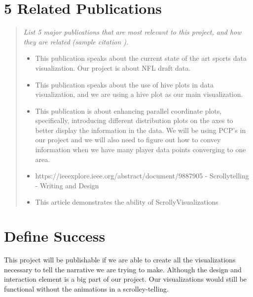 \documentclass{proc}
\begin{document}
\section{5 Related Publications}
\begin{quote}
\textit{List 5 major publications that are most relevant to this project, and how they are related (sample citation \cite{wijk2005value}).}
\begin{itemize}
    \item \cite{perin2018state} This publication speaks about the current state of the art sports data visualization. Our project is about NFL draft data.
    \item \cite{krzywinski2012hive} This publication speaks about the use of hive plots in data visualization, and we are using a hive plot as our main visualization.
    \item \cite{janetzko2016enhancing} This publication is about enhancing parallel coordinate plots, specifically, introducing different distribution plots on the  axes to better display the information in the data. We will be using PCP's in our project and we will also need to figure out how to convey information when we have many player data points converging to one area.
    \item \cite{morth2023SCrollyVis}https://ieeexplore.ieee.org/abstract/document/9887905 - Scrollytelling - Writing and Design
    \item \cite{morth2023scrollyvis} This article demonstrates the ability of ScrollyVisualizations 
\end{itemize}
\end{quote}

\section{Define Success}
This project will be publishable if we are able to create all the visualizations necessary to tell the narrative we are trying to make. Although the design and interaction element is a big part of our project. Our visualizations would still be functional without the animations in a scrolley-telling. 



\end{document}
